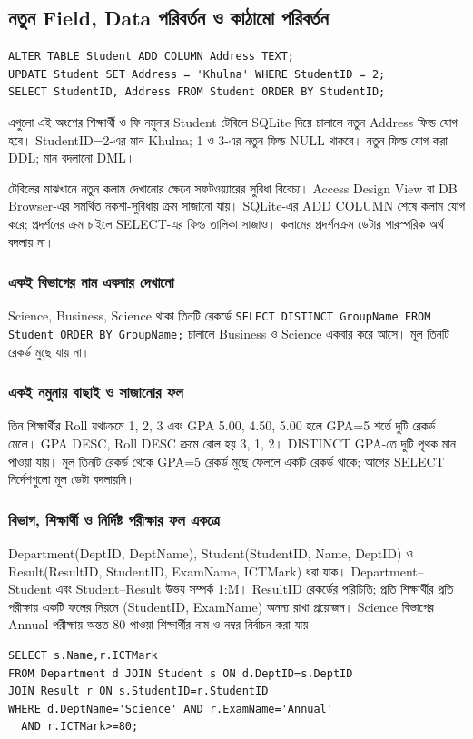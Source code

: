 \subsection{নতুন Field, Data পরিবর্তন ও কাঠামো পরিবর্তন}
\begin{verbatim}
ALTER TABLE Student ADD COLUMN Address TEXT;
UPDATE Student SET Address = 'Khulna' WHERE StudentID = 2;
SELECT StudentID, Address FROM Student ORDER BY StudentID;
\end{verbatim}
এগুলো এই অংশের শিক্ষার্থী ও ফি নমুনার Student টেবিলে SQLite দিয়ে চালালে নতুন Address ফিল্ড যোগ হবে। StudentID=2-এর মান Khulna; 1 ও 3-এর নতুন ফিল্ড NULL থাকবে। নতুন ফিল্ড যোগ করা DDL; মান বদলানো DML।

টেবিলের মাঝখানে নতুন কলাম দেখানোর ক্ষেত্রে সফটওয়্যারের সুবিধা বিবেচ্য। Access Design View বা DB Browser-এর সমর্থিত নকশা-সুবিধায় ক্রম সাজানো যায়। SQLite-এর ADD COLUMN শেষে কলাম যোগ করে; প্রদর্শনের ক্রম চাইলে SELECT-এর ফিল্ড তালিকা সাজাও। কলামের প্রদর্শনক্রম ডেটার পারস্পরিক অর্থ বদলায় না।

\subsubsection{একই বিভাগের নাম একবার দেখানো}
Science, Business, Science থাকা তিনটি রেকর্ডে \texttt{SELECT DISTINCT GroupName FROM Student ORDER BY GroupName;} চালালে Business ও Science একবার করে আসে। মূল তিনটি রেকর্ড মুছে যায় না।

\subsubsection{একই নমুনায় বাছাই ও সাজানোর ফল}
তিন শিক্ষার্থীর Roll যথাক্রমে 1, 2, 3 এবং GPA 5.00, 4.50, 5.00 হলে GPA=5 শর্তে দুটি রেকর্ড মেলে। GPA DESC, Roll DESC ক্রমে রোল হয় 3, 1, 2। DISTINCT GPA-তে দুটি পৃথক মান পাওয়া যায়। মূল তিনটি রেকর্ড থেকে GPA=5 রেকর্ড মুছে ফেললে একটি রেকর্ড থাকে; আগের SELECT নির্দেশগুলো মূল ডেটা বদলায়নি।

\subsubsection{বিভাগ, শিক্ষার্থী ও নির্দিষ্ট পরীক্ষার ফল একত্রে}
Department(DeptID, DeptName), Student(StudentID, Name, DeptID) ও Result(ResultID, StudentID, ExamName, ICTMark) ধরা যাক। Department–Student এবং Student–Result উভয় সম্পর্ক 1:M। ResultID রেকর্ডের পরিচিতি; প্রতি শিক্ষার্থীর প্রতি পরীক্ষায় একটি ফলের নিয়মে (StudentID, ExamName) অনন্য রাখা প্রয়োজন। Science বিভাগের Annual পরীক্ষায় অন্তত 80 পাওয়া শিক্ষার্থীর নাম ও নম্বর নির্বাচন করা যায়—
\begin{verbatim}
SELECT s.Name,r.ICTMark
FROM Department d JOIN Student s ON d.DeptID=s.DeptID
JOIN Result r ON s.StudentID=r.StudentID
WHERE d.DeptName='Science' AND r.ExamName='Annual'
  AND r.ICTMark>=80;
\end{verbatim}

